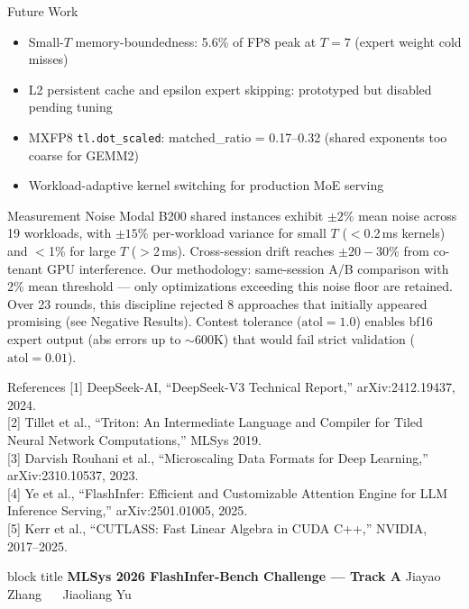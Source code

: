 \documentclass[final,t]{beamer}
\newlength{\colheight}
\begin{document}
\begin{frame}[t]
\begin{minipage}[t]{0.225\textwidth}
\begin{minipage}[t][\colheight][t]{\textwidth}
\begin{block}{Future Work}
\begin{itemize}
\item Small-$T$ memory-boundedness: 5.6\% of FP8 peak at $T{=}7$ (expert weight cold misses)
\item L2 persistent cache and epsilon expert skipping: prototyped but disabled pending tuning
\item MXFP8 \texttt{tl.dot\_scaled}: matched\_ratio = 0.17--0.32 (shared exponents too coarse for GEMM2)
\item Workload-adaptive kernel switching for production MoE serving
\end{itemize}
\end{block}

\begin{block}{Measurement Noise}
Modal B200 shared instances exhibit ${\pm}2\%$ mean noise across 19 workloads, with ${\pm}15\%$ per-workload variance for small $T$ ($<$0.2\,ms kernels) and $<$1\% for large $T$ ($>$2\,ms). Cross-session drift reaches ${\pm}20{-}30\%$ from co-tenant GPU interference. Our methodology: same-session A/B comparison with 2\% mean threshold --- only optimizations exceeding this noise floor are retained. Over 23 rounds, this discipline rejected 8 approaches that initially appeared promising (see Negative Results). Contest tolerance ($\text{atol}{=}1.0$) enables bf16 expert output (abs errors up to ${\sim}600$K) that would fail strict validation ($\text{atol}{=}0.01$).
\end{block}

\begin{block}{References}
\small
[1] DeepSeek-AI, ``DeepSeek-V3 Technical Report,'' arXiv:2412.19437, 2024.\\
{[2]} Tillet et al., ``Triton: An Intermediate Language and Compiler for Tiled Neural Network Computations,'' MLSys 2019.\\
{[3]} Darvish Rouhani et al., ``Microscaling Data Formats for Deep Learning,'' arXiv:2310.10537, 2023.\\
{[4]} Ye et al., ``FlashInfer: Efficient and Customizable Attention Engine for LLM Inference Serving,'' arXiv:2501.01005, 2025.\\
{[5]} Kerr et al., ``CUTLASS: Fast Linear Algebra in CUDA C++,'' NVIDIA, 2017--2025.
\end{block}

\end{minipage}
\end{minipage}

\vfill
\begin{beamercolorbox}[wd=\textwidth,sep=0.2cm]{block title}
\centering
{\small\color{white}\textbf{MLSys 2026 FlashInfer-Bench Challenge --- Track A} \qquad Jiayao Zhang ~\textbullet~ Jiaoliang Yu}
\end{beamercolorbox}
\vspace{-3.5mm}

\end{frame}
\end{document}
